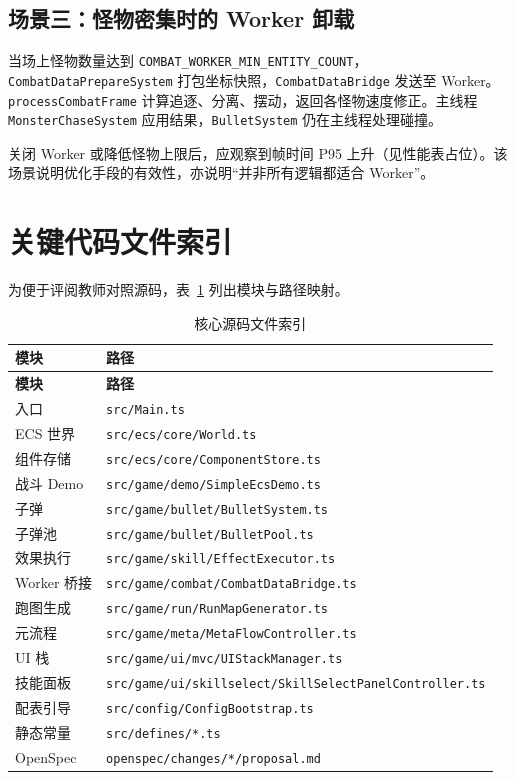 \subsection{场景三：怪物密集时的 Worker 卸载}

当场上怪物数量达到 \texttt{COMBAT\_WORKER\_MIN\_ENTITY\_COUNT}，\texttt{CombatDataPrepareSystem} 打包坐标快照，\texttt{CombatDataBridge} 发送至 Worker。\texttt{processCombatFrame} 计算追逐、分离、摆动，返回各怪物速度修正。主线程 \texttt{MonsterChaseSystem} 应用结果，\texttt{BulletSystem} 仍在主线程处理碰撞。

关闭 Worker 或降低怪物上限后，应观察到帧时间 P95 上升（见性能表占位）。该场景说明优化手段的有效性，亦说明“并非所有逻辑都适合 Worker”。

\section{关键代码文件索引}

为便于评阅教师对照源码，表~\ref{tab:file-index} 列出模块与路径映射。

\begin{longtable}{p{3.5cm}p{9cm}}
  \caption{核心源码文件索引} \label{tab:file-index} \\
  \toprule
  \textbf{模块} & \textbf{路径} \\
  \midrule
  \endfirsthead
  \toprule
  \textbf{模块} & \textbf{路径} \\
  \midrule
  \endhead
  入口 & \texttt{src/Main.ts} \\
  ECS 世界 & \texttt{src/ecs/core/World.ts} \\
  组件存储 & \texttt{src/ecs/core/ComponentStore.ts} \\
  战斗 Demo & \texttt{src/game/demo/SimpleEcsDemo.ts} \\
  子弹 & \texttt{src/game/bullet/BulletSystem.ts} \\
  子弹池 & \texttt{src/game/bullet/BulletPool.ts} \\
  效果执行 & \texttt{src/game/skill/EffectExecutor.ts} \\
  Worker 桥接 & \texttt{src/game/combat/CombatDataBridge.ts} \\
  跑图生成 & \texttt{src/game/run/RunMapGenerator.ts} \\
  元流程 & \texttt{src/game/meta/MetaFlowController.ts} \\
  UI 栈 & \texttt{src/game/ui/mvc/UIStackManager.ts} \\
  技能面板 & \texttt{src/game/ui/skillselect/SkillSelectPanelController.ts} \\
  配表引导 & \texttt{src/config/ConfigBootstrap.ts} \\
  静态常量 & \texttt{src/defines/*.ts} \\
  OpenSpec & \texttt{openspec/changes/*/proposal.md} \\
  \bottomrule
\end{longtable}

